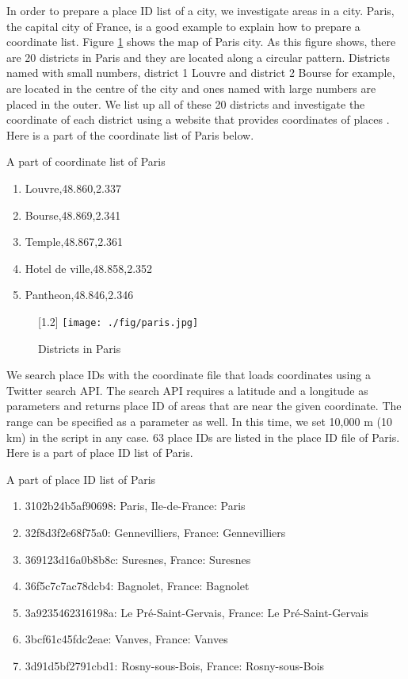 In order to prepare a place ID list of a city, we investigate areas in a city.
Paris, the capital city of France, is a good example to explain how to prepare a coordinate list.
Figure \ref{fig:paris} shows the map of Paris city.
As this figure shows, there are 20 districts in Paris and they are located along a circular pattern.
Districts named with small numbers, district 1 Louvre and district 2 Bourse for example, are located in the centre of the city and ones named with large numbers are placed in the outer. 
We list up all of these 20 districts and investigate the coordinate of each district using a website that provides coordinates of places \cite{latitude}.
Here is a part of the coordinate list of Paris below.

\begin{itembox}[c]{A part of coordinate list of Paris}
	\begin{enumerate}
		\item Louvre,48.860,2.337
		\item Bourse,48.869,2.341
		\item Temple,48.867,2.361
		\item Hotel de ville,48.858,2.352
		\item Pantheon,48.846,2.346
	\end{enumerate}
\end{itembox}

\begin{figure}
	\centering
	\scalebox{1.2}[1.2]{
	\texttt{[image: ./fig/paris.jpg]}
	}
	\caption{Districts in Paris}
	\label{fig:paris}
\end{figure}

We search place IDs with the coordinate file that loads  coordinates using a Twitter search API.
The search API requires a latitude and a longitude as parameters and returns place ID of areas that are near the given coordinate. 
The range can be specified as a parameter as well.
In this time, we set 10,000 m (10 km) in the script in any case.
63 place IDs are listed in the place ID file of Paris.
Here is a part of place ID list of Paris.

\begin{itembox}[c]{A part of place ID list of Paris}
\begin{enumerate}
	\item 3102b24b5af90698: Paris, Ile-de-France: Paris
	\item 32f8d3f2e68f75a0: Gennevilliers, France: Gennevilliers
	\item 369123d16a0b8b8c: Suresnes, France: Suresnes
	\item 36f5c7c7ac78dcb4: Bagnolet, France: Bagnolet
	\item 3a9235462316198a: Le Pré-Saint-Gervais, France: Le Pré-Saint-Gervais
	\item 3bcf61c45fdc2eae: Vanves, France: Vanves
	\item 3d91d5bf2791cbd1: Rosny-sous-Bois, France: Rosny-sous-Bois
\end{enumerate}
\end{itembox}

